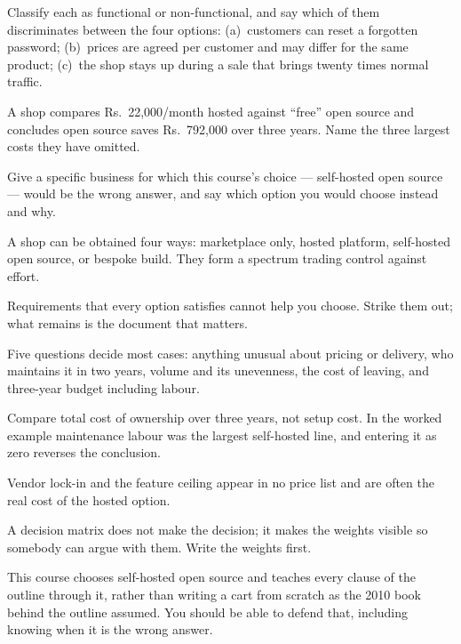 \begin{checkpoint}
\begin{tightnum}
  \item Classify each as functional or non-functional, and say which of them
        discriminates between the four options: (a)~customers can reset a
        forgotten password; (b)~prices are agreed per customer and may differ
        for the same product; (c)~the shop stays up during a sale that brings
        twenty times normal traffic.
  \item A shop compares Rs.~22{,}000/month hosted against ``free'' open source
        and concludes open source saves Rs.~792{,}000 over three years. Name
        the three largest costs they have omitted.
  \item Give a specific business for which this course's choice --- self-hosted
        open source --- would be the wrong answer, and say which option you
        would choose instead and why.
\end{tightnum}
\end{checkpoint}

\begin{chaptersummary}
\begin{tight}
  \item A shop can be obtained four ways: marketplace only, hosted platform,
        self-hosted open source, or bespoke build. They form a spectrum trading
        control against effort.
  \item Requirements that every option satisfies cannot help you choose. Strike
        them out; what remains is the document that matters.
  \item Five questions decide most cases: anything unusual about pricing or
        delivery, who maintains it in two years, volume and its unevenness, the
        cost of leaving, and three-year budget including labour.
  \item Compare total cost of ownership over three years, not setup cost. In
        the worked example maintenance labour was the largest self-hosted line,
        and entering it as zero reverses the conclusion.
  \item Vendor lock-in and the feature ceiling appear in no price list and are
        often the real cost of the hosted option.
  \item A decision matrix does not make the decision; it makes the weights
        visible so somebody can argue with them. Write the weights first.
  \item This course chooses self-hosted open source and teaches every clause of
        the outline through it, rather than writing a cart from scratch as the
        2010 book behind the outline assumed. You should be able to defend
        that, including knowing when it is the wrong answer.
\end{tight}
\end{chaptersummary}

